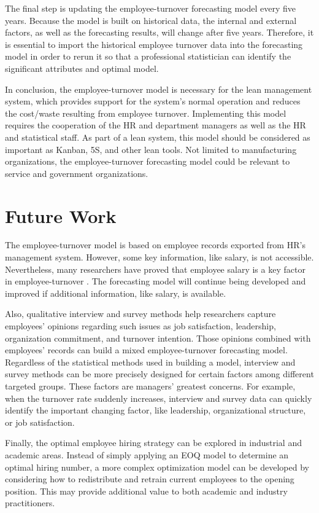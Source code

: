 The final step is updating the employee-turnover forecasting model every five years. Because the model is built on historical data, the internal and external factors, as well as the forecasting results, will change after five years. Therefore, it is essential to import the historical employee turnover data into the forecasting model in order to rerun it so that a professional statistician can identify the significant attributes and optimal model.

In conclusion, the employee-turnover model is necessary for the lean management system, which provides support for the system's normal operation and reduces the cost/waste resulting from employee turnover. Implementing this model requires the cooperation of the HR and department managers as well as the HR and statistical staff. As part of a lean system, this model should be considered as important as Kanban, 5S, and other lean tools.  Not limited to manufacturing organizations, the employee-turnover forecasting model could be relevant to service and government organizations. 

\section{Future Work}
The employee-turnover model is based on employee records exported from HR's management system. However, some key information, like salary, is not accessible. Nevertheless, many researchers have proved that employee salary is a key factor in employee-turnover \citep{griffeth2000}. The forecasting model will continue being developed and improved if additional information, like salary, is available. 

Also, qualitative interview and survey methods help researchers capture employees' opinions regarding such issues as job satisfaction, leadership, organization commitment, and turnover intention. Those opinions combined with employees' records can build a mixed employee-turnover forecasting model. Regardless of the statistical methods used in building a model, interview and survey methods can be more precisely designed for certain factors among different targeted groups. These factors are managers' greatest concerns. For example, when the turnover rate suddenly increases, interview and survey data can quickly identify the important changing factor, like leadership, organizational structure, or job satisfaction. 

Finally, the optimal employee hiring strategy can be explored in industrial and academic areas. Instead of simply applying an EOQ model to determine an optimal hiring number, a more complex optimization model can be developed by considering how to redistribute and retrain current employees to the opening position. This may provide additional value to both academic and industry practitioners.


